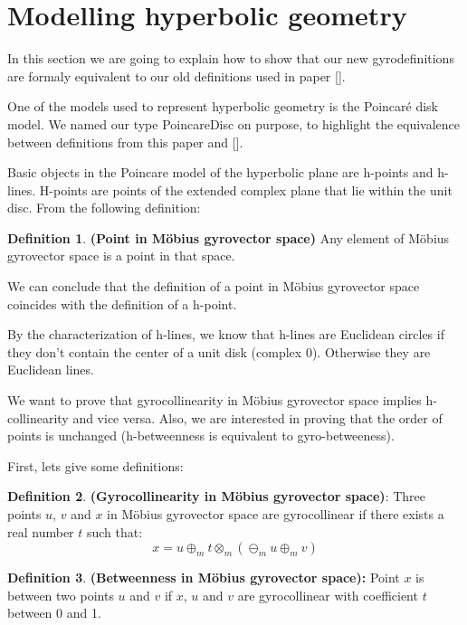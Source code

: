 \documentclass[a4paper]{article}
\theoremstyle{definition}
\newtheorem{definition}{Definition}[section]
\begin{document}
\section{Modelling hyperbolic geometry}\label{sec:models}

In this section we are going to explain how to show that our new gyrodefinitions are formaly equivalent to our old definitions used in paper [].

One of the models used to represent hyperbolic geometry is the Poincar\'{e} disk model. We named our type PoincareDisc on purpose, to highlight the equivalence between definitions from this paper and [].

Basic objects in the Poincare model of the hyperbolic plane are h-points and h-lines. H-points are points of the extended complex plane that lie within the unit disc. From the following definition:
\begin{definition}\textbf{(Point in M\" obius gyrovector space)} Any element of M\" obius gyrovector space is a point in that space.
\end{definition}

We can conclude that the definition of a point in M\" obius gyrovector space coincides with the definition of a h-point.

By the characterization of h-lines, we know that h-lines are Euclidean circles if they don't contain the center of a unit disk (complex $0$). Otherwise they are Euclidean lines.

We want to prove that gyrocollinearity in M\" obius gyrovector space implies h-collinearity and vice versa. Also, we are interested in proving that the order of points is unchanged (h-betweenness is equivalent to gyro-betweeness).

First, lets give some definitions:

\begin{definition}\textbf{(Gyrocollinearity in M\" obius gyrovector space)}: Three points $u$, $v$ and $x$ in M\" obius gyrovector space are gyrocollinear if there exists a real number $t$ such that:
$$x = u\oplus_m t \otimes_m (\ominus_m u \oplus_m v)$$
\end{definition}

\begin{definition}\textbf{(Betweenness in M\" obius gyrovector space):} Point $x$ is between two points $u$ and $v$ if $x$, $u$ and $v$ are gyrocollinear with coefficient $t$ between 0 and 1.
\end{definition}
\end{document}
